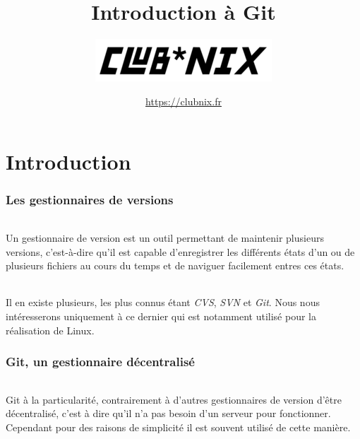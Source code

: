 \documentclass[french, a4paper, 12pt, titlepage]{article}
\begin{document}
\title{Introduction à Git}
\author{\includegraphics{clubnix}}
\date{\url{https://clubnix.fr}}

\maketitle

\vfill
\pagebreak

\newpage
\strut\thispagestyle{empty}
\vfill
\pagebreak
\tableofcontents
\strut\thispagestyle{empty}
\newpage
\setcounter{page}{1}

\part{Introduction}

\section{Les gestionnaires de versions}

\paragraph{} Un gestionnaire de version est un outil permettant de maintenir
plusieurs versions, c'est-à-dire qu'il est capable d'enregistrer les différents
états d'un ou de plusieurs fichiers au cours du temps et de naviguer facilement
entres ces états.

\paragraph{} Il en existe plusieurs, les plus connus étant \emph{CVS},
\emph{SVN} et \emph{Git}.  Nous nous intéresserons uniquement à ce dernier qui
est notamment utilisé pour la réalisation de Linux.

\section{Git, un gestionnaire décentralisé}

\paragraph{} Git à la particularité, contrairement à d'autres gestionnaires de
version d'être décentralisé, c'est à dire qu'il n'a pas besoin d'un serveur
pour fonctionner.  Cependant pour des raisons de simplicité il est souvent
utilisé de cette manière.
\end{document}
